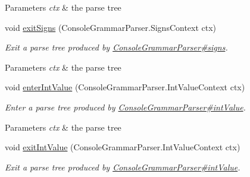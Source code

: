 \begin{DoxyCompactItemize}
\begin{DoxyCompactList}
\begin{DoxyParams}{Parameters}
{\em ctx} & the parse tree\\
\hline
\end{DoxyParams}
 \end{DoxyCompactList}\item 
void \hyperlink{classgov_1_1nasa_1_1jpf_1_1inspector_1_1client_1_1parser_1_1_console_grammar_base_listener_ad31946957b6ab37e3455ba0b3c11f07c}{exit\+Signs} (Console\+Grammar\+Parser.\+Signs\+Context ctx)
\begin{DoxyCompactList}\small\item\em Exit a parse tree produced by \hyperlink{classgov_1_1nasa_1_1jpf_1_1inspector_1_1client_1_1parser_1_1_console_grammar_parser_ab04c24317356d7b5f9d1ba1b0a8ed331}{Console\+Grammar\+Parser\#signs}.


\begin{DoxyParams}{Parameters}
{\em ctx} & the parse tree\\
\hline
\end{DoxyParams}
 \end{DoxyCompactList}\item 
void \hyperlink{classgov_1_1nasa_1_1jpf_1_1inspector_1_1client_1_1parser_1_1_console_grammar_base_listener_a34dc56a353db2d88ed7c1f20798e0f7c}{enter\+Int\+Value} (Console\+Grammar\+Parser.\+Int\+Value\+Context ctx)
\begin{DoxyCompactList}\small\item\em Enter a parse tree produced by \hyperlink{classgov_1_1nasa_1_1jpf_1_1inspector_1_1client_1_1parser_1_1_console_grammar_parser_a132b5d5236398d90d8d1e6b16dc0bd20}{Console\+Grammar\+Parser\#int\+Value}.


\begin{DoxyParams}{Parameters}
{\em ctx} & the parse tree\\
\hline
\end{DoxyParams}
 \end{DoxyCompactList}\item 
void \hyperlink{classgov_1_1nasa_1_1jpf_1_1inspector_1_1client_1_1parser_1_1_console_grammar_base_listener_a081571ea658a1d8de5395b0e7c4e3cf8}{exit\+Int\+Value} (Console\+Grammar\+Parser.\+Int\+Value\+Context ctx)
\begin{DoxyCompactList}\small\item\em Exit a parse tree produced by \hyperlink{classgov_1_1nasa_1_1jpf_1_1inspector_1_1client_1_1parser_1_1_console_grammar_parser_a132b5d5236398d90d8d1e6b16dc0bd20}{Console\+Grammar\+Parser\#int\+Value}.



\end{DoxyCompactList}
\end{DoxyCompactItemize}
